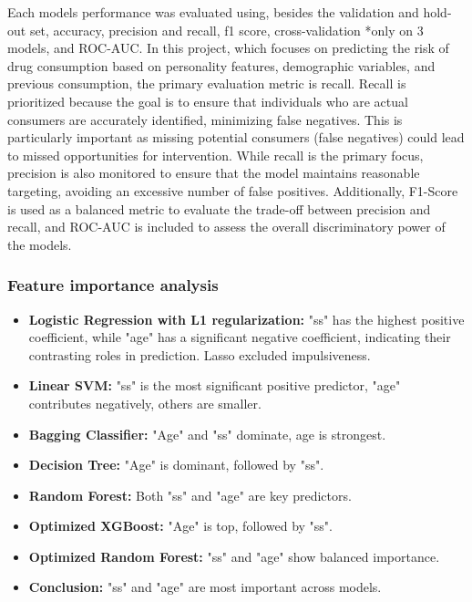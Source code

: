 \documentclass{article}
\begin{document}
Each models performance was evaluated using, besides the validation and hold-out set, accuracy, precision and recall, f1 score, cross-validation *only on 3 models, and ROC-AUC.
In this project, which focuses on predicting the risk of drug consumption based on personality features, demographic variables, and previous consumption, the primary evaluation metric is recall. Recall is prioritized because the goal is to ensure that individuals who are actual consumers are accurately identified, minimizing false negatives. This is particularly important as missing potential consumers (false negatives) could lead to missed opportunities for intervention. While recall is the primary focus, precision is also monitored to ensure that the model maintains reasonable targeting, avoiding an excessive number of false positives. Additionally, F1-Score is used as a balanced metric to evaluate the trade-off between precision and recall, and ROC-AUC is included to assess the overall discriminatory power of the models.

\subsubsection*{Feature importance analysis}

\begin{itemize}
    \item \textbf{Logistic Regression with L1 regularization:} "ss" has the highest positive coefficient, while "age" has a significant negative coefficient, indicating their contrasting roles in prediction. Lasso excluded impulsiveness.
    
    \item \textbf{Linear SVM:} "ss" is the most significant positive predictor, "age" contributes negatively, others are smaller.
    
    \item \textbf{Bagging Classifier:} "Age" and "ss" dominate, age is strongest.
    
    \item \textbf{Decision Tree:} "Age" is dominant, followed by "ss".
    
    \item \textbf{Random Forest:} Both "ss" and "age" are key predictors.
    
    \item \textbf{Optimized XGBoost:} "Age" is top, followed by "ss".
    
    \item \textbf{Optimized Random Forest:} "ss" and "age" show balanced importance.
    
    \item \textbf{Conclusion:} "ss" and "age" are most important across models.
\end{itemize}
\end{document}
